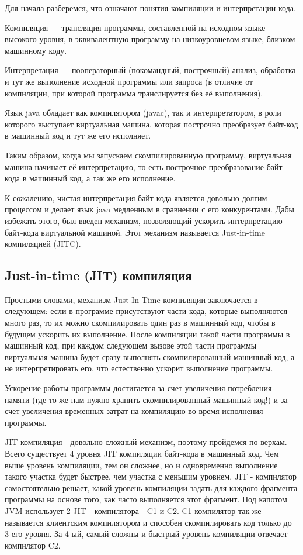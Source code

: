 \documentclass[]{scrartcl}
\begin{document}
Для начала разберемся, что означают понятия компиляции и интерпретации кода.

Компиляция — трансляция программы, составленной на исходном языке высокого уровня, в эквивалентную программу на низкоуровневом языке, близком машинному коду. 

Интерпретация — пооператорный (покомандный, построчный) анализ, обработка и тут же выполнение исходной программы или запроса (в отличие от компиляции, при которой программа транслируется без её выполнения).

Язык java обладает как компилятором (javac), так и интерпретатором, в роли которого выступает виртуальная машина, которая построчно преобразует байт-код в машинный код и тут же его исполняет. 

Таким образом, когда мы запускаем скомпилированную программу, виртуальная машина начинает её интерпретацию, то есть построчное преобразование байт-кода в машинный код, а так же его исполнение.

К сожалению, чистая интерпретация байт-кода является довольно долгим процессом и делает язык java медленным в сравнении с его конкурентами. Дабы избежать этого, был введен механизм, позволяющий ускорить интерпретацию байт-кода виртуальной машиной. Этот механизм называется Just-in-time компиляцией (JITC).

\subsection{Just-in-time (JIT) компиляция}

Простыми словами, механизм Just-In-Time компиляции заключается в следующем: если в программе присутствуют части кода, которые выполняются много раз, то их можно скомпилировать один раз в машинный код, чтобы в будущем ускорить их выполнение. После компиляции такой части программы в машинный код, при каждом следующем вызове этой части программы виртуальная машина будет сразу выполнять скомпилированный машинный код, а не интерпретировать его, что естественно ускорит выполнение программы.

Ускорение работы программы достигается за счет увеличения потребления памяти (где-то же нам нужно хранить скомпилированный машинный код!) и за счет увеличения временных затрат на компиляцию во время исполнения программы.

JIT компиляция - довольно сложный механизм, поэтому пройдемся по верхам. Всего существует 4 уровня JIT компиляции байт-кода в машинный код. Чем выше уровень компиляции, тем он сложнее, но и одновременно выполнение такого участка будет быстрее, чем участка с меньшим уровнем. JIT - компилятор самостоятельно решает, какой уровень компиляции задать для каждого фрагмента программы на основе того, как часто выполняется этот фрагмент. Под капотом JVM использует 2 JIT - компилятора - C1 и C2. C1 компилятор так же называется клиентским компилятором и способен скомпилировать код только до 3-его уровня. За 4-ый, самый сложны и быстрый уровень компиляции отвечает компилятор C2.
\end{document}
